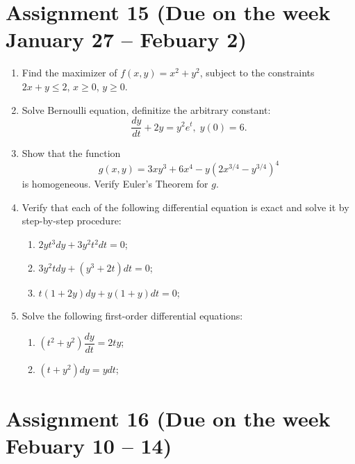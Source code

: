 \documentclass[12pt]{article} %
\theoremstyle{definition} %
\begin{document}
\section*{Assignment 15 (Due on the week January 27 – Febuary 2)}

\begin{enumerate}
\item Find the maximizer of $f(x,y)=x^2+y^2$, subject to the constraints $2x+y\leq 2$, $x\geq0$, $y\geq 0$.

\item Solve Bernoulli equation, definitize the arbitrary constant:
\[
	\frac{dy}{dt}+2y=y^2e^t, \; y(0)=6.
\]

\item Show that the function
\[
	g(x,y)=3xy^3+6x^4-y(2x^{3/4}-y^{3/4})^4
\]
is homogeneous. Verify Euler's Theorem for $g$.

\item Verify that each of the following differential equation is exact and solve it by step-by-step procedure:
\begin{enumerate}
\item $2yt^3dy+3y^2t^2dt=0$;
\item $3y^2tdy+(y^3+2t)dt=0$;
\item $t(1+2y)dy+y(1+y)dt=0$;
\end{enumerate}
\item Solve the following first-order differential equations:
\begin{enumerate}
\item $(t^2+y^2)\dfrac{dy}{dt}=2ty$;
\item $(t+y^2)dy=ydt$;
\end{enumerate}
\end{enumerate}



\section*{Assignment 16 (Due on the week Febuary 10 – 14)}
\end{document}
